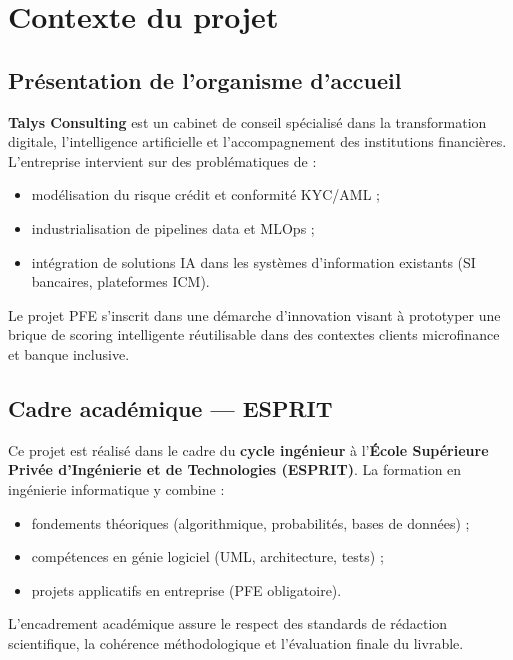 \chapter{Contexte du projet}
\label{ch:contexte}

\section{Présentation de l'organisme d'accueil}

\textbf{Talys Consulting} est un cabinet de conseil spécialisé dans la transformation digitale, l'intelligence artificielle et l'accompagnement des institutions financières. L'entreprise intervient sur des problématiques de :
\begin{itemize}[leftmargin=*]
  \item modélisation du risque crédit et conformité KYC/AML ;
  \item industrialisation de pipelines data et MLOps ;
  \item intégration de solutions IA dans les systèmes d'information existants (SI bancaires, plateformes ICM).
\end{itemize}

Le projet PFE s'inscrit dans une démarche d'innovation visant à prototyper une brique de scoring intelligente réutilisable dans des contextes clients microfinance et banque inclusive.

\section{Cadre académique — ESPRIT}

Ce projet est réalisé dans le cadre du \textbf{cycle ingénieur} à l'\textbf{École Supérieure Privée d'Ingénierie et de Technologies (ESPRIT)}. La formation en ingénierie informatique y combine :
\begin{itemize}[leftmargin=*]
  \item fondements théoriques (algorithmique, probabilités, bases de données) ;
  \item compétences en génie logiciel (UML, architecture, tests) ;
  \item projets applicatifs en entreprise (PFE obligatoire).
\end{itemize}

L'encadrement académique assure le respect des standards de rédaction scientifique, la cohérence méthodologique et l'évaluation finale du livrable.


